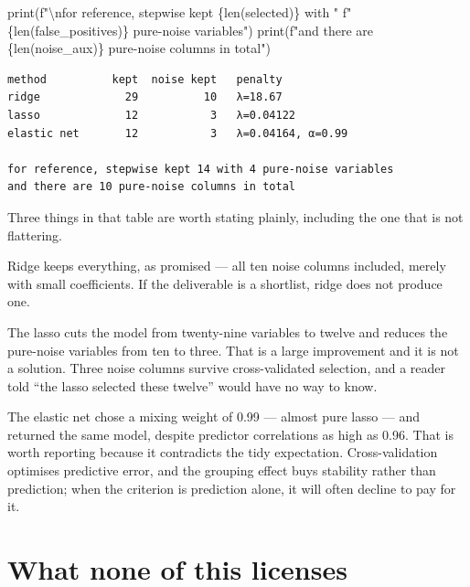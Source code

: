 \documentclass[
  letterpaper,
  10pt,
  twoside,
  openright,
  numbers=noenddot,
  chapterprefix=true]{scrbook}
\newenvironment{Shaded}{}{}
\newcommand{\BuiltInTok}[1]{\textcolor[rgb]{0.84,0.23,0.29}{#1}}
\newcommand{\CharTok}[1]{\textcolor[rgb]{0.01,0.18,0.38}{#1}}
\newcommand{\NormalTok}[1]{\textcolor[rgb]{0.14,0.16,0.18}{#1}}
\newcommand{\SpecialCharTok}[1]{\textcolor[rgb]{0.00,0.36,0.77}{#1}}
\newcommand{\SpecialStringTok}[1]{\textcolor[rgb]{0.01,0.18,0.38}{#1}}
\begin{document}
\begin{Shaded}
\begin{Highlighting}[]
\BuiltInTok{print}\NormalTok{(}\SpecialStringTok{f"}\CharTok{\textbackslash{}n}\SpecialStringTok{for reference, stepwise kept }\SpecialCharTok{\{}\BuiltInTok{len}\NormalTok{(selected)}\SpecialCharTok{\}}\SpecialStringTok{ with "}
      \SpecialStringTok{f"}\SpecialCharTok{\{}\BuiltInTok{len}\NormalTok{(false\_positives)}\SpecialCharTok{\}}\SpecialStringTok{ pure{-}noise variables"}\NormalTok{)}
\BuiltInTok{print}\NormalTok{(}\SpecialStringTok{f"and there are }\SpecialCharTok{\{}\BuiltInTok{len}\NormalTok{(noise\_aux)}\SpecialCharTok{\}}\SpecialStringTok{ pure{-}noise columns in total"}\NormalTok{)}
\end{Highlighting}
\end{Shaded}

\begin{verbatim}
method          kept  noise kept   penalty
ridge             29          10   λ=18.67
lasso             12           3   λ=0.04122
elastic net       12           3   λ=0.04164, α=0.99

for reference, stepwise kept 14 with 4 pure-noise variables
and there are 10 pure-noise columns in total
\end{verbatim}

Three things in that table are worth stating plainly, including the one
that is not flattering.

Ridge keeps everything, as promised --- all ten noise columns included,
merely with small coefficients. If the deliverable is a shortlist, ridge
does not produce one.

The lasso cuts the model from twenty-nine variables to twelve and
reduces the pure-noise variables from ten to three. That is a large
improvement and it is not a solution. Three noise columns survive
cross-validated selection, and a reader told ``the lasso selected these
twelve'' would have no way to know.

The elastic net chose a mixing weight of 0.99 --- almost pure lasso ---
and returned the same model, despite predictor correlations as high as
0.96. That is worth reporting because it contradicts the tidy
expectation. Cross-validation optimises predictive error, and the
grouping effect buys stability rather than prediction; when the
criterion is prediction alone, it will often decline to pay for it.

\section{What none of this licenses}\label{what-none-of-this-licenses}
\end{document}
